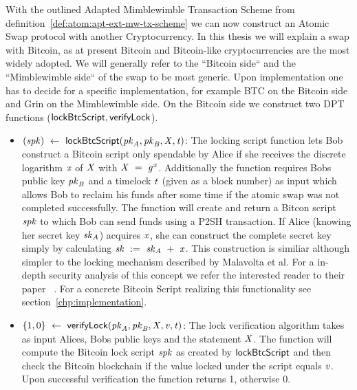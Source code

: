 With the outlined Adapted Mimblewimble Transaction Scheme from definition~\ref{def:atom:apt-ext-mw-tx-scheme} we can now construct an Atomic Swap protocol with another Cryptocurrency.
In this thesis we will explain a swap with Bitcoin, as at present Bitcoin and Bitcoin-like cryptocurrencies are the most widely adopted.
We will generally refer to the ``Bitcoin side`` and the ``Mimblewimble side`` of the swap to be most generic.
Upon implementation one has to decide for a specific implementation, for example BTC on the Bitcoin side and Grin on
the Mimblewimble side.
On the Bitcoin side we construct two DPT functions ($\mathsf{lockBtcScript}, \mathsf{verifyLock}$).
\begin{itemize}
    \item $(\mathit{spk}) ~\leftarrow~ \mathsf{lockBtcScript} (\mathit{pk}_{\mathit{A}},\mathit{pk}_{\mathit{B}},\mathit{X},\mathit{t})$:
    The locking script function lets Bob construct a Bitcoin script only spendable by Alice if she receives the discrete logarithm
    $\mathit{x}$ of $\mathit{X}$ with $\mathit{X} ~=~ \mathit{g}^{\mathit{x}}$.
    Additionally the function requires Bobs public key $\mathit{pk}_{\mathit{B}}$ and a timelock $\mathit{t}$ (given as a block
    number) as input which allows Bob to reclaim his funds after some time if the atomic swap was not
    completed successfully. The function will create and return a Bitcon script $\mathit{spk}$ to which Bob can send funds using a P2SH transaction.
    If Alice (knowing her secret key $\mathit{sk}_{\mathit{A}}$) acquires $\mathit{x}$, she can construct the complete secret key simply
    by calculating $\mathit{sk} ~:=~ \mathit{sk}_{\mathit{A}} ~+~ \mathit{x}$.
    This construction is similiar although simpler to the locking mechanism described by Malavolta et al. For a in-depth security analysis of this concept we refer the interested reader to their paper ~\cite{malavolta2019anonymous}.
    For a concrete Bitcoin Script realizing this functionality see section~\ref{chp:implementation}.
    \item $\{ 1,0 \} ~\leftarrow~ \mathsf{verifyLock} (\mathit{pk}_{\mathit{A}},\mathit{pk}_{\mathit{B}},\mathit{X},\mathit{v},\mathit{t})$:
    The lock verification algorithm takes as input Alices,
    Bobs public keys and the statement $\mathit{X}$. The function will compute the Bitcoin lock script
    $\mathit{spk}$ as created by $\mathsf{lockBtcScript}$ and then check the Bitcoin blockchain if the value locked
    under the script equals $\mathit{v}$.
    Upon successful verification the function returns 1, otherwise 0.
\end{itemize}

